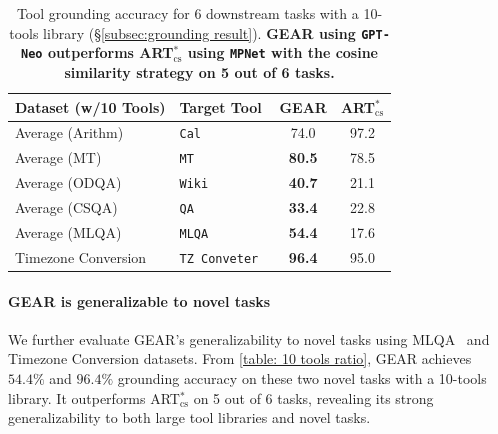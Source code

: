 \documentclass[11pt]{article}
\newcommand{\daniel}[1]{{\color{purple}[DK: #1]}}
\newcommand{\yining}[1]{{\color{ForestGreen}[YL: #1]}}
\newcommand{\name}{{\fontfamily{cmss}\selectfont GEAR}}
\newcommand{\mt}{{\tt MT}}
\newcommand{\qa}{{\tt QA}}
\newcommand{\wiki}{{\tt Wiki}}
\newcommand{\gptNeo}{{\tt \textcolor{darkblueTwo}{GPT-Neo}}}
\newcommand{\mpnet}{{\tt \textcolor{darkblueTwo}{MPNet}}}
\begin{document}
\begin{table}[t]
\small
\begin{tabular*}{\linewidth}{@{\extracolsep{\fill}} llcc}
\toprule
\textbf{Dataset (w/10 Tools)}    & \textbf{Target Tool} & \name   & ART$^\ast_{\text{cs}}$    \\ \midrule
Average (Arithm) & \tt{Cal}   & 74.0 & 97.2 \\
Average (MT)   & \mt{}    & \textbf{80.5} & 78.5 \\
Average (ODQA)  & \wiki{}   & \textbf{40.7} & 21.1 \\
Average (CSQA)  & \qa{}    & \textbf{33.4} & 22.8 \\
Average (MLQA)   & \tt{MLQA}  & \textbf{54.4} & 17.6 \\
Timezone Conversion & \tt{TZ Conveter} & \textbf{96.4} & 95.0 \\ \bottomrule
\end{tabular*}
\caption{Tool grounding accuracy for 6 downstream tasks with a 10-tools library (\S\ref{subsec:grounding result}). \textbf{\name{} using \gptNeo{} outperforms ART$^\ast_{\text{cs}}$ using \mpnet{} with the cosine similarity strategy on 5 out of 6 tasks.}
}
\label{table: 10 tools ratio}
\end{table}


\paragraph{\name{} is generalizable to novel tasks} We further evaluate \name's generalizability to novel tasks using MLQA~\citep{lewis2020mlqa} and Timezone Conversion datasets. From \autoref{table: 10 tools ratio}, \name{} achieves $54.4\%$ and $96.4\%$ grounding accuracy on these two novel tasks with a 10-tools library. It outperforms ART$^\ast_{\text{cs}}$ on 5 out of 6 tasks, revealing its strong generalizability to both large tool libraries and novel tasks.
\end{document}
